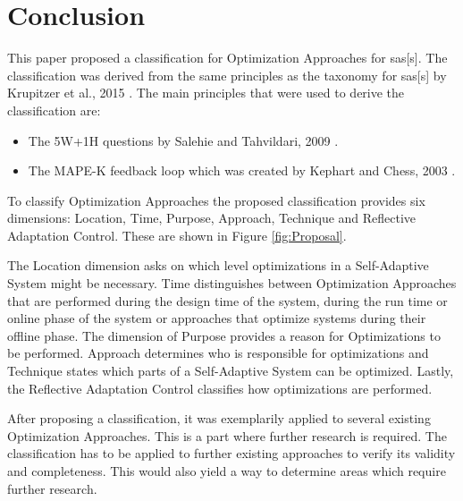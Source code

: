 \section{Conclusion}
\label{ch:Conclusion}


This paper proposed a classification for Optimization Approaches for \acrlong{sas}[s].
The classification was derived from the same principles as the taxonomy for \acrlong{sas}[s]
by Krupitzer et al., 2015 \cite*{SurveyOnEngineeringApproaches}.
The main principles that were used to derive the classification are:
\begin{itemize}[nosep]
    \item The 5W+1H questions by Salehie and Tahvildari, 2009 \cite*{LandscapeAndResearchChallenges}.
    \item The MAPE-K feedback loop which was created by Kephart and Chess, 2003 \cite*{VisionOfAutonomicComputing}.
\end{itemize}

To classify Optimization Approaches the proposed classification provides six dimensions:
Location, Time, Purpose, Approach, Technique and Reflective Adaptation Control.
These are shown in Figure \ref{fig:Proposal}.

\noindent The Location dimension asks on which level optimizations in a Self-Adaptive System might be necessary.
Time distinguishes between Optimization Approaches that are performed during the design time of the system,
during the run time or online phase of the system or approaches that optimize systems during their offline phase.
The dimension of Purpose provides a reason for Optimizations to be performed.
Approach determines who is responsible for optimizations
and Technique states which parts of a Self-Adaptive System can be optimized.
Lastly, the Reflective Adaptation Control classifies how optimizations are performed.

\noindent After proposing a classification, it was exemplarily applied to several existing Optimization Approaches.
This is a part where further research is required. 
The classification has to be applied to further existing approaches to verify its validity and completeness.
This would also yield a way to determine areas which require further research.

